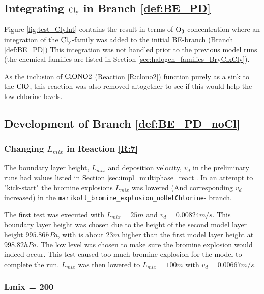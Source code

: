 \subsection{Integrating $\mathrm{Cl_y}$ in Branch \ref{def:BE_PD}}

Figure \ref{fig:test_ClyInt} contains the result in terms of $\mathrm{O_3}$ concentration where an integration of the $\mathrm{Cl_y}$-family was added to the initial BE-branch (Branch \ref{def:BE_PD}) This integration was not handled prior to the previous model runs (the chemical families are listed in Section \ref{sec:halogen_families_BryClxCly}). 

\medskip

As the inclusion of $\mathrm{ClONO2}$ (Reaction \ref{R:clono2}) function purely as a sink to the $\mathrm{ClO}$, this reaction was also removed altogether to see if this would help the low chlorine levels. 



\subsection{Development of Branch \ref{def:BE_PD_noCl}}

\subsubsection{Changing $L_{mix}$ in Reaction \ref{R:7}}

The boundary layer height, $L_{mix}$ and deposition velocity, $v_d$ in the preliminary runs had values listed in Section \ref{sec:impl_multiphase_react}. In an attempt to "kick-start" the bromine explosions $L_{mix}$ was lowered (And corresponding $v_d$ increased) in the \texttt{marikoll\_bromine\_explosion\_noHetChlorine}- branch. 

\medskip

The first test was executed with $L_{mix} = 25 m$ and $v_d = 0.00824 m/s$. This boundary layer height was chosen due to the height of the second model layer height $995.86 hPa$, with is about $23 m$ higher than the first model layer height at $998.82 hPa$. The low level was chosen to make sure the bromine explosion would indeed occur. This test caused too much bromine explosion for the model to complete the run. $L_{mix}$ was then lowered to $L_{mix} = 100 m$ with $v_d = 0.00667 m/s$. 

\subsubsection{Lmix = 200}

